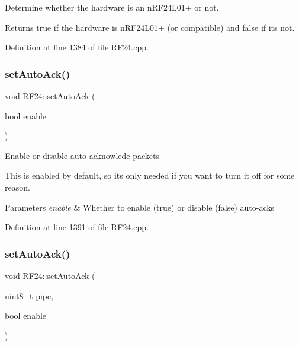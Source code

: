 Determine whether the hardware is an n\+R\+F24\+L01+ or not.

\begin{DoxyReturn}{Returns}
true if the hardware is n\+R\+F24\+L01+ (or compatible) and false if its not. 
\end{DoxyReturn}


Definition at line 1384 of file R\+F24.\+cpp.

\mbox{\label{classRF24_aec71746d59da978bcbb975167886a2cc}} 
\subsubsection{\texorpdfstring{set\+Auto\+Ack()}{setAutoAck()}\hspace{0.1cm}{\footnotesize\ttfamily [1/2]}}
{\footnotesize\ttfamily void R\+F24\+::set\+Auto\+Ack (\begin{DoxyParamCaption}\item[{bool}]{enable }\end{DoxyParamCaption})}

Enable or disable auto-\/acknowlede packets

This is enabled by default, so it\textquotesingle{}s only needed if you want to turn it off for some reason.


\begin{DoxyParams}{Parameters}
{\em enable} & Whether to enable (true) or disable (false) auto-\/acks \\
\hline
\end{DoxyParams}


Definition at line 1391 of file R\+F24.\+cpp.

\mbox{\label{classRF24_a60dba9e558f3620ab489af68ea3dea9c}} 
\subsubsection{\texorpdfstring{set\+Auto\+Ack()}{setAutoAck()}\hspace{0.1cm}{\footnotesize\ttfamily [2/2]}}
{\footnotesize\ttfamily void R\+F24\+::set\+Auto\+Ack (\begin{DoxyParamCaption}\item[{uint8\+\_\+t}]{pipe,  }\item[{bool}]{enable }\end{DoxyParamCaption})}

